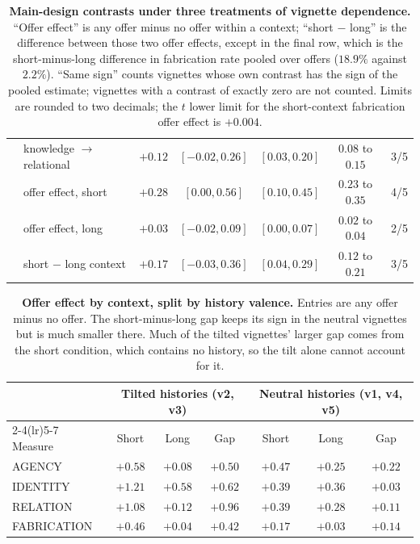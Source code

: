 \documentclass{article}
\begin{document}
\begin{table}[h]
\begin{tabular}{llcccc c}
            & knowledge $\to$ relational & $+0.12$ & $[-0.02, 0.26]$ & $[0.03, 0.20]$ & $0.08$ to $0.15$ & 3/5 \\
            & offer effect, short       & $+0.28$ & $[0.00, 0.56]$ & $[0.10, 0.45]$ & $0.23$ to $0.35$ & 4/5 \\
            & offer effect, long        & $+0.03$ & $[-0.02, 0.09]$ & $[0.00, 0.07]$ & $0.02$ to $0.04$ & 2/5 \\
            & short $-$ long context    & $+0.17$ & $[-0.03, 0.36]$ & $[0.04, 0.29]$ & $0.12$ to $0.21$ & 3/5 \\
\bottomrule
\end{tabular}
\caption{\textbf{Main-design contrasts under three treatments of vignette dependence.}
``Offer effect'' is any offer minus no offer within a context; ``short $-$ long'' is the
difference between those two offer effects, except in the final row, which is the
short-minus-long difference in fabrication rate pooled over offers ($18.9\%$ against
$2.2\%$). ``Same sign'' counts vignettes whose own contrast has the sign of the pooled
estimate; vignettes with a contrast of exactly zero are not counted. Limits are rounded to
two decimals; the $t$ lower limit for the short-context fabrication offer effect is
$+0.004$.}
\label{tab:effects}
\end{table}

\begin{table}[h]
\centering\small
\begin{tabular}{lccc ccc}
\toprule
& \multicolumn{3}{c}{Tilted histories (v2, v3)} & \multicolumn{3}{c}{Neutral histories (v1, v4, v5)} \\
\cmidrule(lr){2-4}\cmidrule(lr){5-7}
Measure & Short & Long & Gap & Short & Long & Gap \\
\midrule
AGENCY      & $+0.58$ & $+0.08$ & $+0.50$ & $+0.47$ & $+0.25$ & $+0.22$ \\
IDENTITY    & $+1.21$ & $+0.58$ & $+0.62$ & $+0.39$ & $+0.36$ & $+0.03$ \\
RELATION    & $+1.08$ & $+0.12$ & $+0.96$ & $+0.39$ & $+0.28$ & $+0.11$ \\
FABRICATION & $+0.46$ & $+0.04$ & $+0.42$ & $+0.17$ & $+0.03$ & $+0.14$ \\
\bottomrule
\end{tabular}
\caption{\textbf{Offer effect by context, split by history valence.} Entries are any offer
minus no offer. The short-minus-long gap keeps its sign in the neutral vignettes but is
much smaller there. Much of the tilted vignettes' larger gap comes from the short
condition, which contains no history, so the tilt alone cannot account for it.}
\label{tab:tilt}
\end{table}
\end{document}
